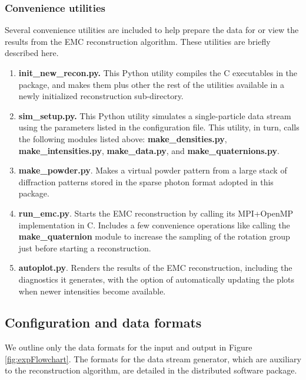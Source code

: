 \documentclass[preprint]{iucr}              %
\begin{document}
\subsubsection{Convenience utilities}\label{subsubsec:utils}
Several convenience utilities are included to help prepare the data for or view the results from the EMC reconstruction algorithm. These utilities are briefly described here. 
\begin{enumerate}
\item{\bf init\_new\_recon.py.} This Python utility compiles the C executables in the package, and makes them plus other the rest of the utilities available in a newly initialized reconstruction sub-directory.
\item{\bf sim\_setup.py.} This Python utility simulates a single-particle data stream using the parameters listed in the configuration file. This utility, in turn, calls the following modules listed above: {\bf make\_densities.py}, {\bf make\_intensities.py}, {\bf make\_data.py}, and {\bf make\_quaternions.py}.
\item{\bf make\_powder.py}. Makes a virtual powder pattern from a large stack of diffraction patterns stored in the sparse photon format adopted in this package.
\item{\bf run\_emc.py}. Starts the EMC reconstruction by calling its MPI+OpenMP implementation in C. Includes a few convenience operations like calling the {\bf make\_quaternion} module to increase the sampling of the rotation group just before starting a reconstruction.
\item{\bf autoplot.py}. Renders the results of the EMC reconstruction, including the diagnostics it generates, with the option of automatically updating the plots when newer intensities become available.
\end{enumerate}


\subsection{Configuration and data formats}\label{subsec:formats}

We outline only the data formats for the input and output in Figure \ref{fig:expFlowchart}. The formats for the data stream generator, which are auxiliary to the reconstruction algorithm, are detailed in the distributed software package. 
\end{document}
